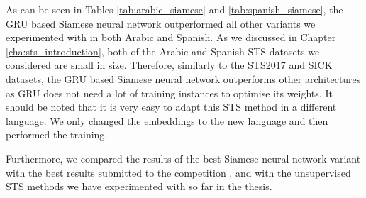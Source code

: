 \begin{table}[htb]
	\centering
	\caption[Results for Spanish STS with Siamese Neural Network]{Results for Spanish STS dataset with different variants of Siamese Neural Network. For each variant, Pearson Correlation ($\bm{\rho}$) and Spearman Correlation ($\bm{\tau}$) are reported between the predicted values and the gold labels of the test set. The best result from all the variations is marked with ${\dagger}$. }  
	\label{tab:spanish_siamese}
\end{table}


As can be seen in Tables \ref{tab:arabic_siamese} and \ref{tab:spanish_siamese}, the GRU based Siamese neural network outperformed all other variants we experimented with in both Arabic and Spanish. As we discussed in Chapter \ref{cha:sts_introduction}, both of the Arabic and Spanish STS datasets we considered are small in size. Therefore, similarly to the STS2017 and SICK datasets, the GRU based Siamese neural network outperforms other architectures as GRU does not need a lot of training instances to optimise its weights. It should be noted that it is very easy to adapt this STS method in a different language. We only changed the embeddings to the new language and then performed the training. 

Furthermore, we compared the results of the best Siamese neural network variant with the best results submitted to the competition \autocite{cer-etal-2017-semeval}, and with the unsupervised STS methods we have experimented with so far in the thesis. 


